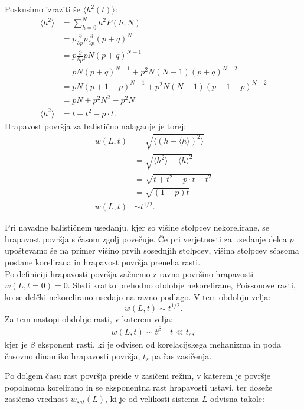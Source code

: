 \documentclass[a4paper, twoside, 12pt]{book}
\begin{document}
Poskusimo izraziti še $\langle h^2(t) \rangle $:
\begin{align}
  \langle h^2 \rangle &= \sum_{h=0}^{N} h^2 P(h,N) \\
  &= p \frac{\partial}{\partial p}p \frac{\partial}{\partial p} (p + q)^N \\
  &= p \frac{\partial}{\partial p} p N (p + q)^{N-1} \\
  &= p N (p + q)^{N-1} + p^2 N (N - 1) (p + q)^{N-2} \\
  &= p N (p + 1 - p)^{N-1} + p^2 N (N - 1) (p + 1 - p)^{N-2} \\
  &= p N + p^2 N^2 - p^2 N \\
  \langle h^2 \rangle &= t + t^2 - p \cdot t.
\end{align}
Hrapavost površja za balistično nalaganje je torej:
\begin{align}
  w(L,t) &= \sqrt{\langle (h - \langle h \rangle)^2\rangle} \\
  &= \sqrt{\langle h^2 \rangle - \langle h \rangle^2} \\
  &= \sqrt{t + t^2 - p \cdot t - t^2} \\
  &= \sqrt{(1-p)t} \\
  w(L,t) &\sim t^{1/2}.
\end{align}

Pri navadne balističnem usedanju, kjer so višine stolpcev nekorelirane, se hrapavost površja s časom zgolj povečuje. Če pri verjetnosti za usedanje delca $p$ upoštevamo še na primer višino prvih sosednjih stolpcev, višina stolpcev sčasoma postane korelirana in hrapavost površja preneha rasti. \\
Po definiciji hrapavosti površja začnemo z ravno površino hrapavosti $w(L,t=0)=0$. Sledi kratko prehodno obdobje nekorelirane, Poissonove rasti, ko se delčki nekorelirano usedajo na ravno podlago. V tem obdobju velja: 
\begin{equation}
  w(L,t) \sim t^{1/2}.
\end{equation}
Za tem nastopi obdobje rasti, v katerem velja:
  \begin{equation}
    \begin{array}{lr} w(L,t) \sim t^\beta  & \ t \ll t_s, \end{array}
    \label{beta}
  \end{equation}
kjer je $\beta$ eksponent rasti, ki je odvisen od korelacijskega mehanizma in poda časovno dinamiko hrapavosti površja, $t_s$ pa čas zasičenja.

Po dolgem času rast površja preide v zasičeni režim, v katerem je površje popolnoma korelirano in se eksponentna rast hrapavosti ustavi, ter doseže zasičeno vrednost $w_{sat}(L)$, ki je od velikosti sistema $L$ odvisna takole:
\end{document}
